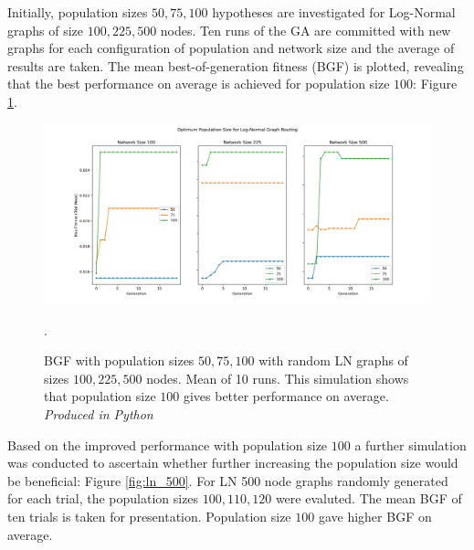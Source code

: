 \documentclass[
	a4paper, %
	10pt, %
	unnumberedsections, %
	twoside, %
]{LTJournalArticle}
\begin{document}
Initially,  population sizes \(50, 75, 100\) hypotheses are investigated for Log-Normal graphs of size \(100, 225, 500\) nodes. Ten runs of the GA are committed with new graphs for each configuration of population and network size and the average of results are taken. The mean best-of-generation fitness (BGF) is plotted, revealing that the best performance on average is achieved for population size \(100\): Figure \ref{fig:pop_1}. 

\begin{figure}
	\includegraphics[width=\linewidth]{Figures/sims/population/lognormal.jpg}
	\caption{BGF with population sizes \(50, 75, 100\) with random LN graphs of sizes \(100, 225, 500\) nodes. Mean of 10 runs. This simulation shows that population size \(100\) gives better performance on average. \emph{Produced in Python}}. 
	\label{fig:pop_1}
\end{figure}

Based on the improved performance with population size \(100\) a further simulation was conducted to ascertain whether further increasing the population size would be beneficial: Figure \ref{fig:ln_500}. For LN 500 node graphs randomly generated for each trial, the population sizes \(100, 110, 120\) were evaluted. The mean BGF of ten trials is taken for presentation. Population size \(100\) gave higher BGF on average. 
\end{document}
